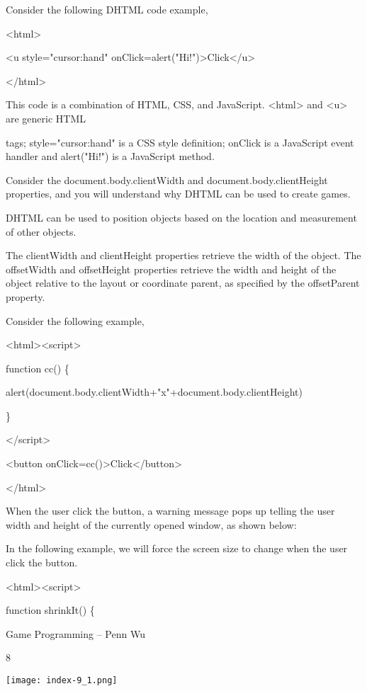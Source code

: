 \documentclass[
]{article}
\begin{document}
Consider the following DHTML code example,

\textless html\textgreater{}

\textless u style="cursor:hand"
onClick=alert("Hi!")\textgreater Click\textless/u\textgreater{}

\textless/html\textgreater{}

This code is a combination of HTML, CSS, and JavaScript.
\textless html\textgreater{} and \textless u\textgreater{} are generic
HTML

tags; style="cursor:hand" is a CSS style definition; onClick is a
JavaScript event handler and alert("Hi!") is a JavaScript method.

Consider the document.body.clientWidth and document.body.clientHeight
properties, and you will understand why DHTML can be used to create
games.

DHTML can be used to position objects based on the location and
measurement of other objects.

The clientWidth and clientHeight properties retrieve the width of the
object. The offsetWidth and offsetHeight properties retrieve the width
and height of the object relative to the layout or coordinate parent, as
specified by the offsetParent property.

Consider the following example,

\textless html\textgreater\textless script\textgreater{}

function cc() \{

alert(document.body.clientWidth+"x"+document.body.clientHeight)

\}

\textless/script\textgreater{}

\textless button
onClick=cc()\textgreater Click\textless/button\textgreater{}

\textless/html\textgreater{}

When the user click the button, a warning message pops up telling the
user width and height of the currently opened window, as shown below:

In the following example, we will force the screen size to change when
the user click the button.

\textless html\textgreater\textless script\textgreater{}

function shrinkIt() \{

Game Programming -- Penn Wu

8

\protect\hypertarget{index_split_001.htmlux5cux23p9}{}{}\texttt{[image: index-9\_1.png]}
\end{document}
